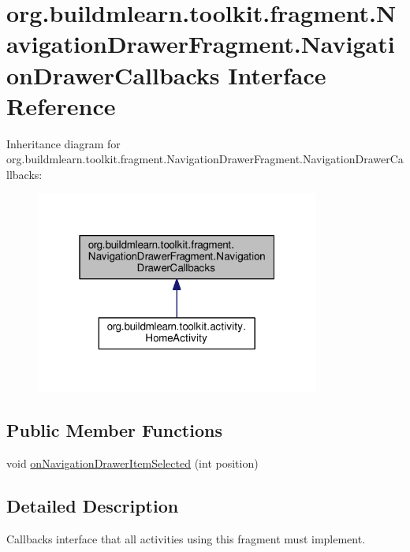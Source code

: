 \hypertarget{interfaceorg_1_1buildmlearn_1_1toolkit_1_1fragment_1_1NavigationDrawerFragment_1_1NavigationDrawerCallbacks}{}\section{org.\+buildmlearn.\+toolkit.\+fragment.\+Navigation\+Drawer\+Fragment.\+Navigation\+Drawer\+Callbacks Interface Reference}
\label{interfaceorg_1_1buildmlearn_1_1toolkit_1_1fragment_1_1NavigationDrawerFragment_1_1NavigationDrawerCallbacks}


Inheritance diagram for org.\+buildmlearn.\+toolkit.\+fragment.\+Navigation\+Drawer\+Fragment.\+Navigation\+Drawer\+Callbacks\+:
\nopagebreak
\begin{figure}[H]
\begin{center}
\leavevmode
\includegraphics[width=265pt]{interfaceorg_1_1buildmlearn_1_1toolkit_1_1fragment_1_1NavigationDrawerFragment_1_1NavigationDrawerCallbacks__inherit__graph}
\end{center}
\end{figure}
\subsection*{Public Member Functions}
\begin{DoxyCompactItemize}
\item 
void \hyperlink{interfaceorg_1_1buildmlearn_1_1toolkit_1_1fragment_1_1NavigationDrawerFragment_1_1NavigationDrawerCallbacks_a6068a4dec53d00ec47c222f995064e6c}{on\+Navigation\+Drawer\+Item\+Selected} (int position)
\end{DoxyCompactItemize}


\subsection{Detailed Description}
Callbacks interface that all activities using this fragment must implement. 

